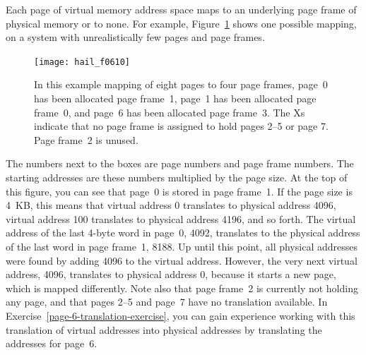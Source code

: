 Each page of virtual memory address space maps to an underlying page
frame of physical memory or to none. For example,
Figure~\ref{example-mapping} shows one possible mapping, on a system
with unrealistically few pages and page frames.
\begin{figure}
\centerline{\texttt{[image: hail\_f0610]}}

\caption{In this example mapping of eight pages to four page frames,
  page~0 has been allocated page frame~1, page~1 has been allocated
  page frame~0, and page~6 has been allocated page frame~3.  The Xs
  indicate that no page frame is assigned to hold pages 2--5 or
  page 7.  Page frame~2 is unused.}
\label{example-mapping}
\end{figure}
The numbers next to the
boxes are page numbers and page frame numbers.  The starting
addresses are these numbers multiplied by the page size.
At the top of this figure, you can see that page~0 is stored in page
frame~1.  If the page size is 4~KB, this means that virtual address 0
translates to physical address 4096, virtual address 100 translates to
physical address 4196, and so forth.  The virtual address of the last
4-byte word in
page~0, 4092, translates to the physical address of the last word in page frame~1,
8188.  Up until this point, all physical addresses were found by
adding 4096 to the virtual address.  However, the very next virtual
address, 4096, translates to physical address 0, because it starts a
new page, which is mapped differently.  Note also that page frame~2 is
currently not holding any page, and that pages 2--5 and page~7 have no
translation available.  In
Exercise~\ref{page-6-translation-exercise}, you can gain experience working with this
translation of virtual addresses into physical addresses by
translating the addresses for page~6.

